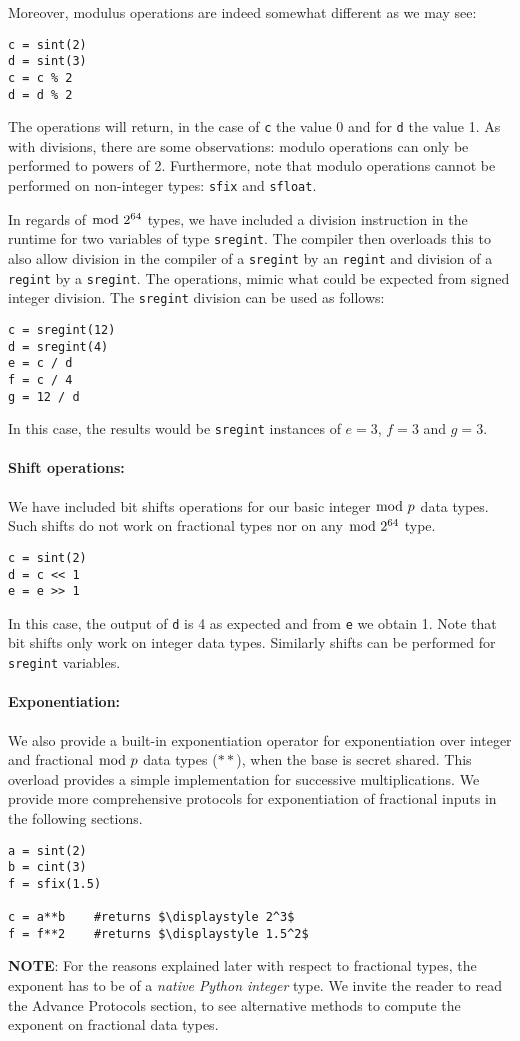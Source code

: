 Moreover,  modulus operations are indeed somewhat different as we may see:
\begin{lstlisting}
c = sint(2)
d = sint(3)
c = c % 2
d = d % 2
\end{lstlisting}
The operations will return, in the case of \verb|c| the value 0 and for \verb|d|
the value 1.
As with divisions, there are some observations:
modulo operations can only be performed to powers of 2.
Furthermore, note that modulo operations cannot be performed
on non-integer types: \verb|sfix| and \verb|sfloat|.

In regards of $\bmod \; 2^{64}$ types, we have included a division instruction in
the runtime for two variables of type \verb|sregint|.
The compiler then overloads this to also allow division in the compiler
of a \verb|sregint| by an \verb|regint| and division of a \verb|regint|
by a \verb|sregint|.
The operations, mimic what could be expected from signed integer division.
The \verb|sregint| division  can be used as follows:
\begin{lstlisting}
c = sregint(12)
d = sregint(4)
e = c / d
f = c / 4
g = 12 / d
\end{lstlisting}
In this case, the results would be \verb|sregint| instances of $ e = 3$, $f = 3$
and $g=3$.

\paragraph{Shift operations:}
We have included bit shifts operations for our basic integer $\bmod \; p$ data types.
Such shifts do not work on fractional types nor on any $\bmod \; 2^{64}$ type.
\begin{lstlisting}
c = sint(2)
d = c << 1
e = e >> 1
\end{lstlisting}
In this case, the output of \verb|d| is 4 as expected and from \verb|e| we obtain 1.
Note that bit shifts only work on integer data types.
Similarly shifts can be performed for \verb|sregint| variables.

\paragraph{Exponentiation:}
We also provide a built-in exponentiation operator for exponentiation over integer and
fractional $\bmod \; p$ data types ($**$), when the base is secret shared.
This overload provides a simple implementation for successive multiplications.
We provide more comprehensive protocols for exponentiation of fractional inputs
in the following sections.
\begin{lstlisting}[mathescape]
a = sint(2)
b = cint(3)
f = sfix(1.5)

c = a**b 	#returns $\displaystyle 2^3$
f = f**2	#returns $\displaystyle 1.5^2$
\end{lstlisting}
\textbf{NOTE}: For the reasons explained later with respect to fractional types,
the exponent has to be of a \textit{native Python integer} type.
We invite the reader to read the Advance Protocols section, to see alternative
methods to compute the exponent on fractional data types.

